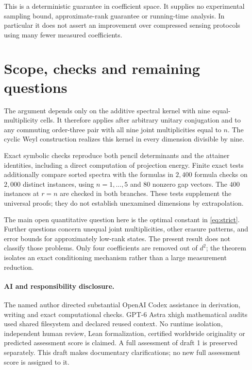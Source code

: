 \documentclass[11pt,a4paper]{article}
\theoremstyle{remark}\newtheorem{remark}[theorem]{Remark}
\begin{document}
This is a deterministic guarantee in coefficient space. It supplies no
experimental sampling bound, approximate-rank guarantee or running-time
analysis. In particular it does not assert an improvement over compressed
sensing protocols using many fewer measured coefficients.

\section{Scope, checks and remaining questions}
The argument depends only on the additive spectral kernel with nine
equal-multiplicity cells. It therefore applies after arbitrary unitary
conjugation and to any commuting order-three pair with all nine joint
multiplicities equal to $n$. The cyclic Weyl construction realizes this
kernel in every dimension divisible by nine.

Exact symbolic checks reproduce both pencil determinants and the
attainer identities, including a direct computation of projection energy.
Finite exact tests additionally compare sorted spectra with the formulas
in $2{,}400$ formula checks on $2{,}000$ distinct instances, using
$n=1,\ldots,5$ and $80$ nonzero gap vectors. The $400$ instances at $r=n$
are checked in both branches.
These tests supplement the universal proofs; they do not establish
unexamined dimensions by extrapolation.

The main open quantitative question here is the optimal constant in
\eqref{eq:strict}. Further questions concern unequal joint
multiplicities, other erasure patterns, and error bounds for approximately
low-rank states. The present result does not classify those problems.
Only four coefficients are removed out of $d^2$; the theorem isolates an
exact conditioning mechanism rather than a large measurement reduction.

\paragraph{AI and responsibility disclosure.}
The named author directed substantial OpenAI Codex assistance in
derivation, writing and exact computational checks. GPT-6 Astra xhigh
mathematical audits used shared filesystem and declared reused context.
No runtime isolation, independent human review, Lean formalization,
certified worldwide originality or predicted assessment score is claimed.
A full assessment of draft 1 is preserved separately. This draft makes
documentary clarifications; no new full assessment score is assigned to it.
\end{document}
